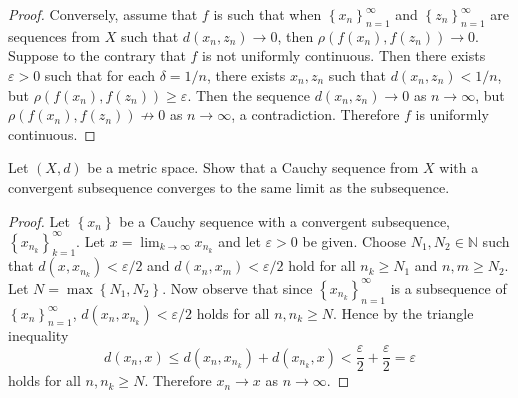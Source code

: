 \documentclass[12pt]{amsart}
\begin{document}
\begin{setup}
\begin{ex}
\begin{proof}
      Conversely, assume that $f$ is such that when $\left\{x_n\right\}_{n=1}^\infty$ and $\left\{z_n\right\}_{n=1}^\infty$ are sequences from $X$ such that $d(x_n, z_n) \rightarrow 0$, then $\rho(f(x_n), f(z_n)) \rightarrow 0$.
      Suppose to the contrary that $f$ is not uniformly continuous.
      Then there exists $\varepsilon > 0$ such that for each $\delta = 1/n$, there exists $x_n, z_n$ such that $d(x_n, z_n) < 1/n$, but $\rho(f(x_n), f(z_n)) \geq \varepsilon.$
      Then the sequence $d(x_n, z_n) \rightarrow 0$ as $n \rightarrow \infty$, but $\rho(f(x_n), f(z_n)) \not \rightarrow 0$ as $n \rightarrow \infty$, a contradiction.
      Therefore $f$ is uniformly continuous.
    \end{proof}
  \end{ex}

\end{setup}

\begin{setup}
  Let $(X,d)$ be a metric space.
  Show that a Cauchy sequence from $X$ with a convergent subsequence converges to the same limit as the subsequence.
  \begin{proof}
    Let $\left\{x_n\right\}$ be a Cauchy sequence with a convergent subsequence, $\left\{x_{n_k}\right\}_{k=1}^\infty$.
    Let $x = \lim_{k \rightarrow \infty} x_{n_k}$ and let $\varepsilon > 0$ be given.
    Choose $N_1, N_2 \in \mathbb{N}$ such that $d(x,x_{n_k}) < \varepsilon/2$ and $d(x_n, x_m) < \varepsilon/2$ hold for all $n_k \geq N_1$ and $n,m \geq N_2$.
    Let $N = \max\left\{N_1, N_2\right\}$.
    Now observe that since $\left\{x_{n_k}\right\}_{n=1}^\infty$ is a subsequence of $\left\{x_n\right\}_{n=1}^\infty$, $d(x_n, x_{n_k}) < \varepsilon/2$ holds for all $n, n_k \geq N$.
    Hence by the triangle inequality $$d(x_n, x) \leq d(x_n, x_{n_k}) + d(x_{n_k}, x) < \frac{\varepsilon}{2} + \frac{\varepsilon}{2} = \varepsilon$$
    holds for all $n, n_k \geq N$.
    Therefore $x_n \rightarrow x$ as $n \rightarrow \infty$.
  \end{proof}
\end{setup}
\end{document}
